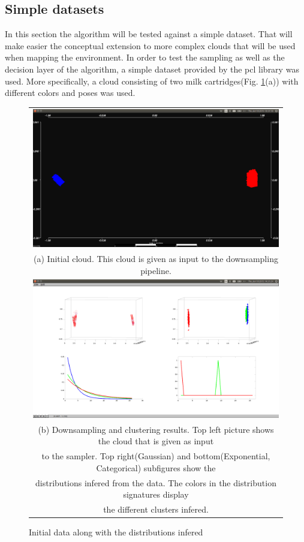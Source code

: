 \documentclass[twoside,hidelinks]{article}
\begin{document}
\subsection{Simple datasets}

In this section the algorithm will be tested against a simple dataset. That will make easier the conceptual extension to more complex clouds that will be used when mapping the environment. In order to test the sampling as well as the decision layer of the algorithm, a simple dataset provided by the pcl\cite{pcl} library was used. More specifically, a cloud consisting of two milk cartridges(Fig. \ref{pcl:clust}(a)) with different colors and poses was used. 

\begin{figure}
\begin{tabular}{c}
  \includegraphics[width=1\textwidth]{clusterings/initialData} \\
  (a) Initial cloud. This cloud is given as input to the downsampling pipeline.  \\
   \includegraphics[width=1\textwidth]{clusterings/colorcodedDistributions} \\
 (b) Downsampling and clustering results. Top left picture shows the cloud that is given as input\\
 to the sampler. Top right(Gaussian) and bottom(Exponential, Categorical) subfigures show the \\
 distributions infered from the data.  The colors in the distribution signatures display \\
 the different clusters infered.\end{tabular}
\caption{Initial data along with the distributions infered }
  \label{pcl:clust}
\end{figure}
\end{document}
